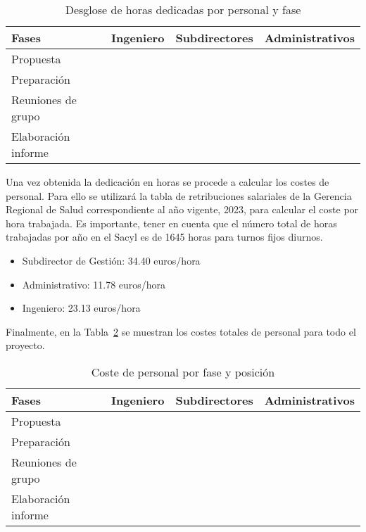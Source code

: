 \begin{table}
    \centering
    \begin{tabular}{llll}
        \toprule
        Fases               & Ingeniero & Subdirectores & Administrativos \\
        \midrule
        Propuesta           &           &               &                 \\
        Preparación         &           &               &                 \\
        Reuniones de grupo  &           &               &                 \\
        Elaboración informe &           &               &                 \\
        \bottomrule
    \end{tabular}
    \caption{Desglose de horas dedicadas por personal y fase}
    \label{tab:horas-trabajadas}
\end{table}

Una vez obtenida la dedicación en horas se procede a calcular los costes de personal. Para ello se utilizará la tabla de retribuciones salariales de la Gerencia Regional de Salud correspondiente al año vigente, 2023, para calcular el coste por hora trabajada. Es importante, tener en cuenta que el número total de horas trabajadas por año en el Sacyl es de 1645 horas para turnos fijos diurnos.

\begin{itemize}
    \item Subdirector de Gestión: 34.40 euros/hora
    \item Administrativo: 11.78 euros/hora
    \item Ingeniero: 23.13 euros/hora
\end{itemize}

Finalmente, en la Tabla~\ref{tab:coste-horas} se muestran los costes totales de personal para todo el proyecto.

\begin{table}
    \centering
    \begin{tabular}{llll}
        \toprule
        Fases               & Ingeniero & Subdirectores & Administrativos \\
        \midrule
        Propuesta           &           &               &                 \\
        Preparación         &           &               &                 \\
        Reuniones de grupo  &           &               &                 \\
        Elaboración informe &           &               &                 \\
        \bottomrule
    \end{tabular}
    \caption{Coste de personal por fase y posición}
    \label{tab:coste-horas}
\end{table}

